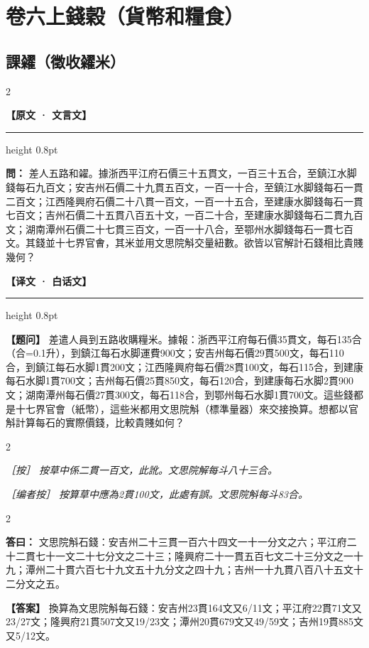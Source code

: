 \documentclass[11pt,a4paper]{article}
\newcommand{\ClassicalQuestion}[1]{\par\noindent\textbf{\color{problemcolor}問：}#1\par}
\newcommand{\ClassicalAnswer}[1]{\par\noindent\textbf{\color{answercolor}答曰：}#1\par}
\newcommand{\ClassicalNote}[1]{\par\noindent\textit{［按］#1}\par}
\newcommand{\ModernQuestion}[1]{\par\noindent\textbf{\color{modernlabel}【题问】}#1\par}
\newcommand{\ModernAnswer}[1]{\par\noindent\textbf{\color{answercolor}【答案】}#1\par}
\newcommand{\ModernNote}[1]{\par\noindent\textit{\color{notecolor}［编者按］#1}\par}
\newcommand{\ClassicalHeader}{%
  \begin{center}\textbf{\color{headerclassical}【原文 · 文言文】}\end{center}
  \vspace{-0.5em}
  \hrule height 0.8pt
  \vspace{0.5em}
}
\newcommand{\ModernHeader}{%
  \begin{center}\textbf{\color{headermodern}【译文 · 白话文】}\end{center}
  \vspace{-0.5em}
  \hrule height 0.8pt
  \vspace{0.5em}
}
\begin{document}
\section*{\color{titlecolor}卷六上\quad 錢穀（貨幣和糧食）}

\subsection*{\color{sectioncolor}課糴（徵收糴米）}

\begin{paracol}{2}

\ClassicalHeader

\ClassicalQuestion{%
差人五路和糴。據浙西平江府石價三十五貫文，一百三十五合，至鎮江水脚錢每石九百文；安吉州石價二十九貫五百文，一百一十合，至鎮江水脚錢每石一貫二百文；江西隆興府石價二十八貫一百文，一百一十五合，至建康水脚錢每石一貫七百文；吉州石價二十五貫八百五十文，一百二十合，至建康水脚錢每石二貫九百文；湖南潭州石價二十七貫三百文，一百一十八合，至鄂州水脚錢每石一貫七百文。其錢並十七界官㑹，其米並用文思院斛交量紐數。欲皆以官解計石錢相比貴賤幾何？}

\switchcolumn

\ModernHeader

\ModernQuestion{%
差遣人員到五路收購糧米。據報：浙西平江府每石價35貫文，每石135合（合=0.1升），到鎮江每石水脚運費900文；安吉州每石價29貫500文，每石110合，到鎮江每石水脚1貫200文；江西隆興府每石價28貫100文，每石115合，到建康每石水脚1貫700文；吉州每石價25貫850文，每石120合，到建康每石水脚2貫900文；湖南潭州每石價27貫300文，每石118合，到鄂州每石水脚1貫700文。這些錢都是十七界官會（紙幣），這些米都用文思院斛（標準量器）來交接換算。想都以官斛計算每石的實際價錢，比較貴賤如何？
}

\end{paracol}

\begin{paracol}{2}

\ClassicalNote{%
按草中係二貫一百文，此訛。文思院解每斗八十三合。}

\switchcolumn

\ModernNote{%
按算草中應為2貫100文，此處有誤。文思院斛每斗83合。
}

\end{paracol}

\begin{paracol}{2}

\ClassicalAnswer{%
文思院斛石錢：安吉州二十三貫一百六十四文一十一分文之六；平江府二十二貫七十一文二十七分文之二十三；隆興府二十一貫五百七文二十三分文之一十九；潭州二十貫六百七十九文五十九分文之四十九；吉州一十九貫八百八十五文十二分文之五。}

\switchcolumn

\ModernAnswer{%
換算為文思院斛每石錢：安吉州23貫164文又6/11文；平江府22貫71文又23/27文；隆興府21貫507文又19/23文；潭州20貫679文又49/59文；吉州19貫885文又5/12文。
}

\end{paracol}
\end{document}
